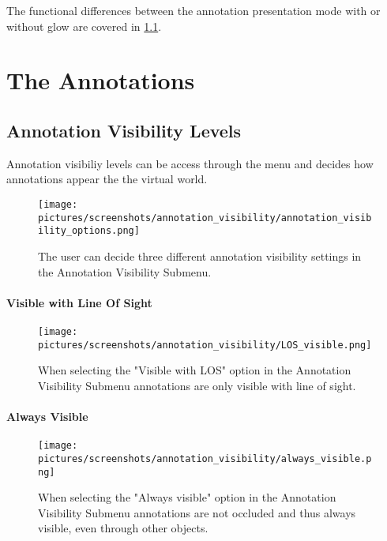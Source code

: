 The functional differences between the annotation presentation mode with or without glow are covered in \ref{sec:annotations}. 


\section{The Annotations}


\subsection{Annotation Visibility Levels}
\label{sec:annotations}
Annotation visibiliy levels can be access through the menu and decides how annotations appear the the virtual world. 

\begin{figure}%
	\texttt{[image: pictures/screenshots/annotation\_visibility/annotation\_visibility\_options.png]}
	\caption[The Annotation Visibility Submenu]{The user can decide three different annotation visibility settings in the Annotation Visibility Submenu.}
	\label{fig:annotation_visibility_options}
\end{figure} 


\paragraph{Visible with Line Of Sight}
\begin{figure}%
	\texttt{[image: pictures/screenshots/annotation\_visibility/LOS\_visible.png]}
	\caption[Annotations only visible with LOS]{When selecting the "Visible with LOS" option in the Annotation Visibility Submenu annotations are only visible with 
				line of sight.}
	\label{fig:LOS_visible}
\end{figure} 


\paragraph{Always Visible}
\begin{figure}%
	\texttt{[image: pictures/screenshots/annotation\_visibility/always\_visible.png]}
	\caption[Annotation always visible]{When selecting the "Always visible" option in the Annotation Visibility Submenu annotations are not occluded and thus always visible, 
	even through other objects.}
	\label{fig:always_visible}
\end{figure} 

